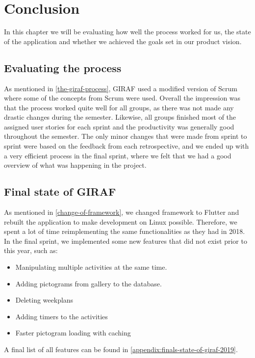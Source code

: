 \chapter{Conclusion}
In this chapter we will be evaluating how well the process worked for us, the state of the application and whether we achieved the goals set in our product vision.

\section{Evaluating the process}
As mentioned in \autoref{the-giraf-process}, GIRAF used a modified version of Scrum where some of the concepts from Scrum were used.
Overall the impression was that the process worked quite well for all groups, as there was not made any drastic changes during the semester.
Likewise, all groups finished most of the assigned user stories for each sprint and the productivity was generally good throughout the semester.
The only minor changes that were made from sprint to sprint were based on the feedback from each retrospective, and we ended up with a very efficient process in the final sprint, where we felt that we had a good overview of what was happening in the project.

\section{Final state of GIRAF}
As mentioned in \autoref{change-of-framework}, we changed framework to Flutter and rebuilt the application to make development on Linux possible.
Therefore, we spent a lot of time reimplementing the same functionalities as they had in 2018.
In the final sprint, we implemented some new features that did not exist prior to this year, such as:
\begin{itemize}
    \item Manipulating multiple activities at the same time.
    \item Adding pictograms from gallery to the database.
    \item Deleting weekplans
    \item Adding timers to the activities
    \item Faster pictogram loading with caching
\end{itemize}
A final list of all features can be found in \autoref{appendix:finals-state-of-giraf-2019}.

